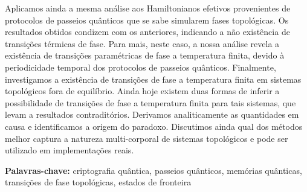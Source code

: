 \documentclass[12pt]{report}
\begin{document}
Aplicamos ainda a mesma an\'{a}lise aos Hamiltonianos efetivos provenientes de protocolos de passeios qu\^{a}nticos que se sabe simularem fases topol\'{o}gicas. Os resultados obtidos condizem com os anteriores, indicando a n\~{a}o exist\^{e}ncia de transi\c{c}\~{o}es t\'{e}rmicas de fase. Para mais, neste caso, a nossa an\'{a}lise revela a exist\^{e}ncia de transi\c{c}\~{o}es param\'{e}tricas de fase a temperatura finita, devido \`{a} periodicidade temporal dos protocolos de passeios qu\^{a}nticos.
Finalmente, investigamos a exist\^{e}ncia de transi\c{c}\~{o}es de fase a temperatura finita em sistemas topol\'{o}gicos fora de equil\'{i}brio. Ainda hoje existem duas formas de inferir a possibilidade de transi\c{c}\~{o}es de fase a temperatura finita para tais sistemas, que levam a resultados contradit\'{o}rios. Derivamos analiticamente as quantidades em causa e identificamos a origem do paradoxo. Discutimos ainda qual dos m\'{e}todos melhor captura a natureza multi-corporal de sistemas topol\'{o}gicos e pode ser utilizado em implementa\c{c}\~{o}es reais.

\vfill
\begin{flushleft}
\textbf{Palavras-chave:} criptografia qu\^{a}ntica, passeios qu\^{a}nticos, mem\'{o}rias qu\^{a}nticas, transi\c{c}\~{o}es de fase topol\'{o}gicas, estados de fronteira
\end{flushleft}
\end{document}
